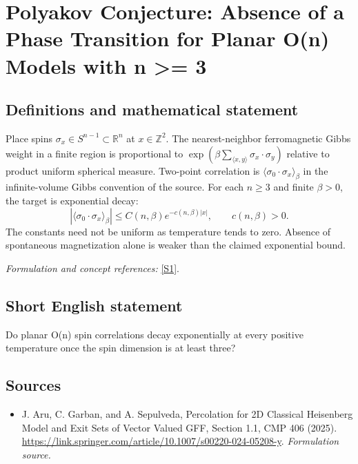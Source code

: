 \documentclass[11pt]{article}
\begin{document}
\section*{\texorpdfstring{Polyakov Conjecture: Absence of a Phase Transition for Planar O(n) Models with n >= 3}{Polyakov Conjecture: Absence of a Phase Transition for Planar O(n) Models with n >= 3}}\label{statement}
\subsection{Definitions and mathematical statement}
Place spins $\sigma_x\in S^{n-1}\subset{\mathbb{R}}^n$ at $x\in{\mathbb{Z}}^2$. The nearest-neighbor ferromagnetic Gibbs weight in a finite region is proportional to
$\exp(\beta\sum_{\langle x,y\rangle}\sigma_x\cdot\sigma_y)$ relative to product uniform spherical measure. Two-point correlation is $\langle\sigma_0\cdot\sigma_x\rangle_\beta$ in the infinite-volume Gibbs convention of the source. For each $n\ge3$ and finite $\beta>0$, the target is exponential decay:
\[
 |\langle\sigma_0\cdot\sigma_x\rangle_\beta|\le C(n,\beta)e^{-c(n,\beta)|x|},
 \qquad c(n,\beta)>0.
\]
The constants need not be uniform as temperature tends to zero. Absence of spontaneous magnetization alone is weaker than the claimed exponential bound.
\par\smallskip\textit{Formulation and concept references:} \href{https://link.springer.com/article/10.1007/s00220-024-05208-y}{[S1]}.

\subsection{Short English statement}
Do planar O(n) spin correlations decay exponentially at every positive temperature once the spin dimension is at least three?
\subsection{Sources}
\begin{itemize}
\item[S1]J. Aru, C. Garban, and A. Sepulveda, Percolation for 2D Classical Heisenberg Model and Exit Sets of Vector Valued GFF, Section 1.1, CMP 406 (2025).
\url{https://link.springer.com/article/10.1007/s00220-024-05208-y}.
\textit{Formulation source.}
\end{itemize}
\end{document}
